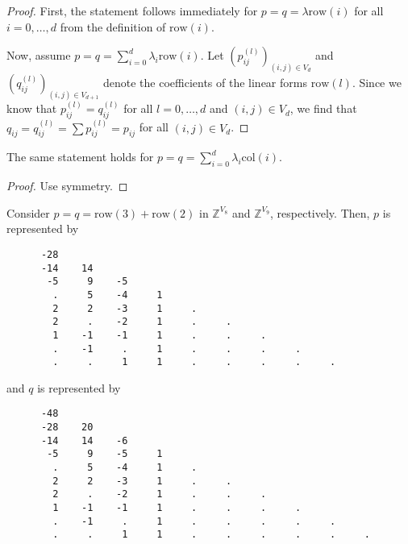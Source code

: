   \begin{proof}
    First, the statement follows immediately for \( p=q= \lambda \mathrm{row}(i) \) for all \( i = 0, \dots, d \) from the definition of \( \mathrm{row}(i) \). 
    
    Now, assume \(  p = q = \sum_{i=0}^{d}  \lambda_{i} \mathrm{row}(i)  \). Let \( (p^{(l)}_{ij})_{(i,j) \in V_d} \) and \( (q^{(l)}_{ij})_{(i,j) \in V_{d+1}} \) denote the coefficients of the linear forms \( \mathrm{row}(l) \). Since we know that \( p^{(l)}_{ij} = q^{(l)}_{ij} \) for all \( l = 0, \dots, d \) and \( (i,j) \in V_d \), we find that \( q_{ij} = q^{(l)}_{ij} = \sum p^{(l)}_{ij} = p_{ij} \) for all \( (i,j) \in V_d \).
  \end{proof}
  
  \begin{corollary}
    The same statement holds for \( p = q = \sum_{i=0}^{d}  \lambda_{i} \mathrm{col}(i) \).
  \end{corollary}
  
  \begin{proof}
    Use symmetry.
  \end{proof}
  

\begin{example}
    Consider \( p = q = \mathrm{row}(3) + \mathrm{row}(2) \) in \( \mathbb{Z}^{V_8} \) and \( \mathbb{Z}^{V_9} \), respectively. Then, \( p \) is represented by 
    \begin{verbatim}
      -28
      -14    14
       -5     9    -5
        .     5    -4     1
        2     2    -3     1     .
        2     .    -2     1     .     .
        1    -1    -1     1     .     .     .
        .    -1     .     1     .     .     .     .
        .     .     1     1     .     .     .     .     .
    \end{verbatim}
    and \( q \) is represented by
    \begin{verbatim}
      -48
      -28    20
      -14    14    -6
       -5     9    -5     1
        .     5    -4     1     . 
        2     2    -3     1     .     .
        2     .    -2     1     .     .     .
        1    -1    -1     1     .     .     .     .
        .    -1     .     1     .     .     .     .     .
        .     .     1     1     .     .     .     .     .     .
    \end{verbatim}
  \end{example}
  